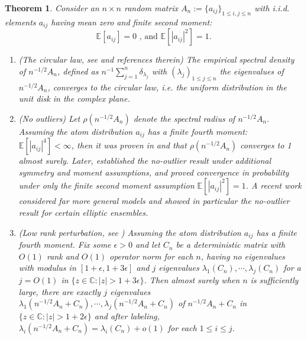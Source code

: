 \documentclass[11pt,reqno]{amsart}
\theoremstyle{plain}
\newtheorem{theorem}{Theorem}[section]
\theoremstyle{remark}
\numberwithin{equation}{section}
\begin{document}
\begin{theorem}\label{zeroththeorem}
Consider an $n\times n$ random matrix $A_n:=\{a_{ij}\}_{1\leq i,j\leq n}$ with i.i.d. elements $a_{ij}$ having mean zero and finite second moment: \begin{equation}\label{firstcondition}\mathbb{E}[a_{ij}]=0 \text{ , and } \mathbb{E}[|a_{ij}|^2]=1.\end{equation} 
\begin{enumerate}
\item (The circular law, see \cite{ WOS:000281425000010} and references therein)  The empirical spectral density of $n^{-1/2}A_n$, defined as $n^{-1}\sum_{j=1}^n\delta_{\lambda_j}$ with $(\lambda_j)_{1\leq j\leq n}$ the eigenvalues of $n^{-1/2}A_n$, converges to the circular law, i.e. the uniform distribution in the unit disk in the complex plane. 
\item (No outliers) Let $\rho(n^{-1/2}A_n)$ denote the spectral radius of $n^{-1/2}A_n$. Assuming the atom distribution $a_{ij}$ has a finite fourth moment: $\mathbb{E}[|a_{ij}|^4]<\infty$, then it was proven in \cite{Bai1986LimitingBO} and \cite{Geman1986THESR} that $\rho(n^{-1/2}A_n)$ converges to 1 almost surely. Later, \cite{ WOS:000435416700013} established the no-outlier result under additional symmetry and moment assumptions, and \cite{bordenave2021convergence} proved convergence in probability under only the finite second moment assumption $\mathbb{E}[|a_{ij}|^2]=1$. A recent work \cite{campbell2024spectral} considered far more general models and showed in particular the no-outlier result for certain elliptic ensembles.

\item (Low rank perturbation, see \cite{tao2013outliers}) Assuming the atom distribution $a_{ij}$ has a finite fourth moment. Fix some $\epsilon>0$ and let $C_n$ be a deterministic matrix with $O(1)$ rank and $O(1)$ operator norm for each $n$, having no eigenvalues with modulus in $[1+\epsilon,1+3\epsilon]$ and $j$ eigenvalues $\lambda_1(C_n),\cdots,\lambda_j(C_n)$ for a $j=O(1)$ in $\{z\in\mathbb{C}:|z|>1+3\epsilon\}$. Then almost surely when $n$ is sufficiently large, there are exactly $j$ eigenvalues $\lambda_1(n^{-1/2}A_n+C_n),\cdots,\lambda_j(n^{-1/2}A_n+C_n)$ of $n^{-1/2}A_n+C_n$ in $\{z\in\mathbb{C}:|z|>1+2\epsilon\}$ and after labeling, $\lambda_i(n^{-1/2}A_n+C_n)=\lambda_i(C_n)+o(1)$ for each $1\leq i\leq j$.
\end{enumerate}

\end{theorem}
\end{document}
